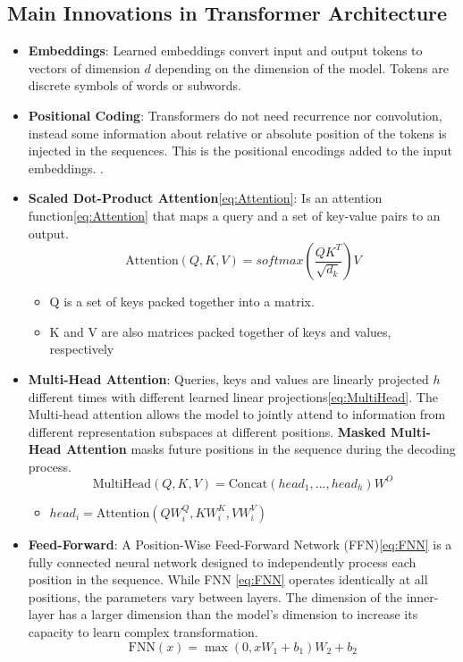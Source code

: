 \subsection{Main Innovations in Transformer Architecture}  
\begin{itemize}
    \item \textbf{Embeddings}: Learned embeddings convert input and output tokens to vectors of dimension $d$ depending on the dimension of the model. Tokens are discrete symbols of words or subwords.
    
    \item \textbf{Positional Coding}:  
    Transformers do not need recurrence nor convolution, instead some information about relative or absolute position of the tokens is injected in the sequences. This is the positional encodings added to the input embeddings. \cite{vaswani2017attention}.  
    \item  \textbf{Scaled Dot-Product Attention}\ref{eq:Attention}: Is an attention function\ref{eq:Attention} that maps a query and a set of key-value pairs to an output.
    \begin{equation}
        \label{eq:Attention}
        \text{Attention}(Q,K,V) = softmax(\frac{QK^T}{\sqrt{d_k}})V 
    \end{equation} 
    \begin{itemize}
        \item Q is a set of keys packed together into a matrix.
        \item K and V are also matrices packed together of keys and values, respectively
    \end{itemize}
    \item \textbf{Multi-Head Attention}:  Queries, keys and values are linearly projected $h$ different times with different learned linear projections\ref{eq:MultiHead}. The Multi-head attention allows the model to jointly attend to information from different representation subspaces at different positions. \textbf{Masked Multi-Head Attention} masks future positions in the sequence during the decoding process\cite{vaswani2017attention}.
    \begin{equation}
        \label{eq:MultiHead}
        \text{MultiHead}(Q,K,V) = \text{Concat}(head_1, ..., head_h)W^O  
    \end{equation}
    \begin{itemize}
        \item $head_i = \text{Attention}(QW_i^Q, KW_i^K,VW_i^V)$
    \end{itemize}
    \item \textbf{Feed-Forward}:  A Position-Wise Feed-Forward Network (FFN)\ref{eq:FNN} is a fully connected neural network designed to independently process each position in the sequence.  While FNN \ref{eq:FNN} operates identically at all positions, the parameters vary between layers. The dimension of the inner-layer has a larger dimension than the model's dimension to increase its capacity to learn complex transformation\cite{vaswani2017attention}.
    \begin{equation}
        \label{eq:FNN}
        \text{FNN}(x) = \max(0,xW_1+b_1)W_2+b_2
    \end{equation}
\end{itemize}
